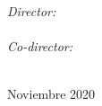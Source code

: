 \documentclass[
11pt, %
spanish, %
singlespacing, %
headsepline, %
]{MastersDoctoralThesis} %
\begin{document}
\begin{titlepage}
\begin{center}
\begin{minipage}[t]{0.5\textwidth}
\begin{flushleft}
			\end{flushleft}		
		\end{minipage}
		\begin{minipage}[t]{0.4\textwidth}
			\begin{flushright} \large
				\emph{Director:} \\
				\supname \\
				\hfill \break
				\emph{Co-director:} \\
				\examname
			\end{flushright}
		\end{minipage}\\[2cm]
				
				
		{\large {Noviembre 2020}}\\[4cm] %
				 
		\vfill
	\end{center}
\end{titlepage}




\end{document}
